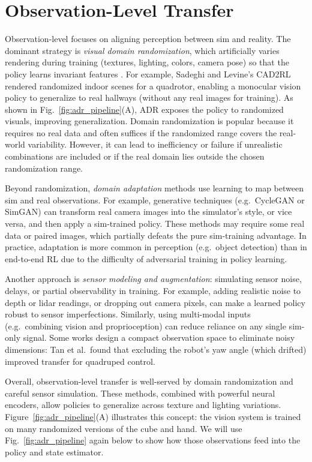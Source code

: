 \section{Observation-Level Transfer}
Observation-level \simtoreal focuses on aligning perception between sim and reality. The dominant strategy is \emph{visual domain randomization}, which artificially varies rendering during training (textures, lighting, colors, camera pose) so that the policy learns invariant features \cite{Sadeghi2017,Tobin2017}. For example, Sadeghi and Levine’s CAD2RL rendered randomized indoor scenes for a quadrotor, enabling a monocular vision policy to generalize to real hallways (without any real images for training)\cite{Sadeghi2017}. As shown in Fig.~\ref{fig:adr_pipeline}(A), ADR exposes the policy to randomized visuals, improving generalization. Domain randomization is popular because it requires no real data and often suffices if the randomized range covers the real-world variability. However, it can lead to inefficiency or failure if unrealistic combinations are included or if the real domain lies outside the chosen randomization range.

Beyond randomization, \emph{domain adaptation} methods use learning to map between sim and real observations. For example, generative techniques (e.g.\ CycleGAN or SimGAN) can transform real camera images into the simulator’s style, or vice versa, and then apply a sim-trained policy\cite{Tzeng2017}. These methods may require some real data or paired images, which partially defeats the pure sim-training advantage. In practice, adaptation is more common in perception (e.g.\ object detection) than in end-to-end RL due to the difficulty of adversarial training in policy learning.

Another approach is \emph{sensor modeling and augmentation}: simulating sensor noise, delays, or partial observability in training. For example, adding realistic noise to depth or lidar readings, or dropping out camera pixels, can make a learned policy robust to sensor imperfections. Similarly, using multi-modal inputs (e.g.\ combining vision and proprioception) can reduce reliance on any single sim-only signal. Some works design a compact observation space to eliminate noisy dimensions: Tan et al.\ found that excluding the robot’s yaw angle (which drifted) improved transfer for quadruped control\cite{Tan2018}. 

Overall, observation-level transfer is well-served by domain randomization and careful sensor simulation. These methods, combined with powerful neural encoders, allow policies to generalize across texture and lighting variations\cite{Tobin2017,Sadeghi2017}. Figure~\ref{fig:adr_pipeline}(A) illustrates this concept: the vision system is trained on many randomized versions of the cube and hand. We will use Fig.~\ref{fig:adr_pipeline} again below to show how those observations feed into the policy and state estimator.

